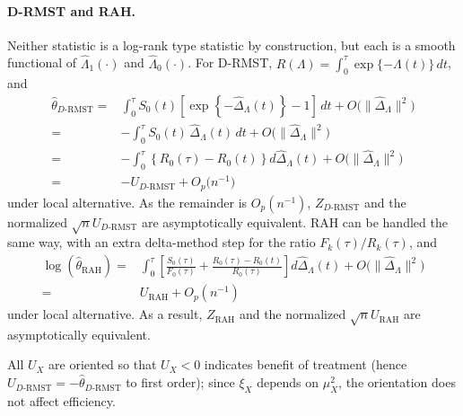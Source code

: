 \documentclass[12pt]{article}
\newcommand{\RAH}{\mathrm{RAH}}
\newcommand{\DRMST}{D\text{-}\mathrm{RMST}}
\newcommand{\dd}{\,d}
\begin{document}
\paragraph{D-RMST and RAH.}
Neither statistic is a log-rank type statistic by construction, but each is a
smooth functional of $\hat\Lambda_1(\cdot)$ and
$\hat\Lambda_0(\cdot)$.
For D-RMST, $R(\Lambda)=\int_0^\tau \exp\{-\Lambda(t)\}\dd t$, and
\begin{align*}
\hat{\theta}_{\DRMST}
=&\int_0^\tau S_0(t)\left[\exp\left\{-\hat{\Delta}_\Lambda(t)\right\}-1\right]\dd t+O\bigl(\|\hat{\Delta}_\Lambda\|^2\bigr)\\
=& -\int_0^\tau S_0(t)\,\hat{\Delta}_\Lambda(t)\dd t +O\bigl(\|\hat{\Delta}_\Lambda\|^2\bigr)\\
=&-\int_0^\tau \left\{R_0(\tau)-R_0(t)\right\}d\hat{\Delta}_\Lambda(t)+O\bigl(\|\hat{\Delta}_\Lambda\|^2\bigr) \\
=&-U_{\DRMST}+O_p\bigl(n^{-1}\bigr)
\label{eq:drmst-expansion}
\end{align*}
under local alternative. As the remainder is $O_p(n^{-1})$, $Z_{\DRMST}$ and the normalized $\sqrt{n}U_{\DRMST}$ are asymptotically equivalent.  RAH can be handled the same way, with an extra delta-method step for the ratio $F_k(\tau)/R_k(\tau)$, and
\begin{align*}
\log(\hat{\theta}_{\RAH})=& \int_0^\tau \left[\frac{S_0(\tau)}{F_0(\tau)}
              +\frac{ R_0(\tau)-R_0(t)}{R_0(\tau)}\right]d\hat{\Delta}_\Lambda(t)+O\bigl(\|\hat{\Delta}_\Lambda\|^2\bigr)\\
              =& U_{\RAH}+O_p(n^{-1})
\end{align*}
under local alternative. As a result, $Z_{\RAH}$ and the normalized $\sqrt{n}U_{\RAH}$ are asymptotically equivalent.

All $U_X$ are oriented so that $U_X<0$ indicates benefit of treatment (hence $U_{\DRMST}=-\hat\theta_{\DRMST}$ to first order); since $\xi_X$ depends on $\mu_X^2$, the orientation does not affect efficiency.
\end{document}
